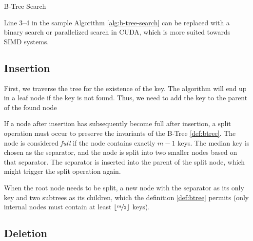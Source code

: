 \begin{algorithm}
  \caption{B-Tree Search}\label{alg:b-tree-search}
  \DontPrintSemicolon


\end{algorithm}

Line 3--4 in the sample Algorithm \ref{alg:b-tree-search} can be replaced with a binary search or parallelized search in CUDA, which is more suited towards SIMD systems.

\subsection{Insertion}

First, we traverse the tree for the existence of the key. The algorithm will end up in a leaf node if the key is not found. Thus, we need to add the key to the parent of the found node

If a node after insertion has subsequently become full after insertion, a split operation must occur to preserve the invariants of the B-Tree \ref{def:btree}. The node is considered \textit{full} if the node contains exactly $m - 1$ keys. The median key is chosen as the separator, and the node is split into two smaller nodes based on that separator. The separator is inserted into the parent of the split node, which might trigger the split operation again.

When the root node needs to be split, a new node with the separator as its only key and two subtrees as its children, which the definition \ref{def:btree} permits (only internal nodes must contain at least $\lfloor\nicefrac{m}{2}\rfloor$ keys).

\subsection{Deletion}

